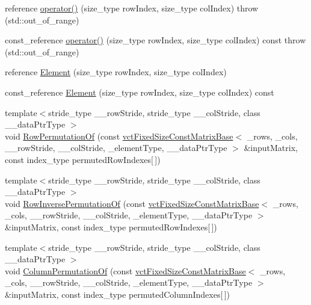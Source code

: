 \begin{DoxyCompactItemize}
\item 
reference \hyperlink{classvct_fixed_size_matrix_base_ac52c39af5e05d2b50b3d07a552ef3640}{operator()} (size\+\_\+type row\+Index, size\+\_\+type col\+Index)  throw (std\+::out\+\_\+of\+\_\+range)
\item 
const\+\_\+reference \hyperlink{classvct_fixed_size_matrix_base_a62fcc044ff6fb34e194f0d3e138ac148}{operator()} (size\+\_\+type row\+Index, size\+\_\+type col\+Index) const   throw (std\+::out\+\_\+of\+\_\+range)
\item 
reference \hyperlink{classvct_fixed_size_matrix_base_af5902e2612c32f77f8db2d774957a378}{Element} (size\+\_\+type row\+Index, size\+\_\+type col\+Index)
\item 
const\+\_\+reference \hyperlink{classvct_fixed_size_matrix_base_aad8ff7a5c3253f691872fdeed019cde9}{Element} (size\+\_\+type row\+Index, size\+\_\+type col\+Index) const 
\item 
{\footnotesize template$<$stride\+\_\+type \+\_\+\+\_\+row\+Stride, stride\+\_\+type \+\_\+\+\_\+col\+Stride, class \+\_\+\+\_\+data\+Ptr\+Type $>$ }\\void \hyperlink{classvct_fixed_size_matrix_base_a2137b6301386c1d6215016fa70fd5803}{Row\+Permutation\+Of} (const \hyperlink{classvct_fixed_size_const_matrix_base}{vct\+Fixed\+Size\+Const\+Matrix\+Base}$<$ \+\_\+rows, \+\_\+cols, \+\_\+\+\_\+row\+Stride, \+\_\+\+\_\+col\+Stride, \+\_\+element\+Type, \+\_\+\+\_\+data\+Ptr\+Type $>$ \&input\+Matrix, const index\+\_\+type permuted\+Row\+Indexes\mbox{[}$\,$\mbox{]})
\item 
{\footnotesize template$<$stride\+\_\+type \+\_\+\+\_\+row\+Stride, stride\+\_\+type \+\_\+\+\_\+col\+Stride, class \+\_\+\+\_\+data\+Ptr\+Type $>$ }\\void \hyperlink{classvct_fixed_size_matrix_base_ab41253c2d33ceaa891c78a6d94056b67}{Row\+Inverse\+Permutation\+Of} (const \hyperlink{classvct_fixed_size_const_matrix_base}{vct\+Fixed\+Size\+Const\+Matrix\+Base}$<$ \+\_\+rows, \+\_\+cols, \+\_\+\+\_\+row\+Stride, \+\_\+\+\_\+col\+Stride, \+\_\+element\+Type, \+\_\+\+\_\+data\+Ptr\+Type $>$ \&input\+Matrix, const index\+\_\+type permuted\+Row\+Indexes\mbox{[}$\,$\mbox{]})
\item 
{\footnotesize template$<$stride\+\_\+type \+\_\+\+\_\+row\+Stride, stride\+\_\+type \+\_\+\+\_\+col\+Stride, class \+\_\+\+\_\+data\+Ptr\+Type $>$ }\\void \hyperlink{classvct_fixed_size_matrix_base_aa73932f32c0bf1b44136615a6f1be4dc}{Column\+Permutation\+Of} (const \hyperlink{classvct_fixed_size_const_matrix_base}{vct\+Fixed\+Size\+Const\+Matrix\+Base}$<$ \+\_\+rows, \+\_\+cols, \+\_\+\+\_\+row\+Stride, \+\_\+\+\_\+col\+Stride, \+\_\+element\+Type, \+\_\+\+\_\+data\+Ptr\+Type $>$ \&input\+Matrix, const index\+\_\+type permuted\+Column\+Indexes\mbox{[}$\,$\mbox{]})

\end{DoxyCompactItemize}
